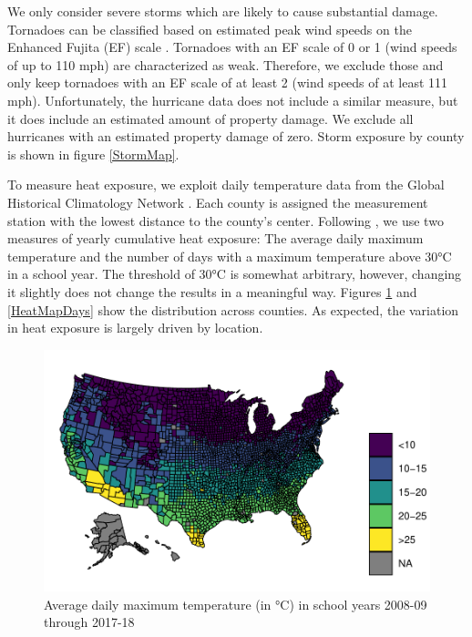 We only consider severe storms which are likely to cause substantial damage. Tornadoes can be classified based on estimated peak wind speeds on the Enhanced Fujita (EF) scale \citep[for more details see][]{EF_Scale}. Tornadoes with an EF scale of 0 or 1 (wind speeds of up to 110 mph) are characterized as weak. Therefore, we exclude those and only keep tornadoes with an EF scale of at least 2 (wind speeds of at least 111 mph). Unfortunately, the hurricane data does not include a similar measure, but it does include an estimated amount of property damage. We exclude all hurricanes with an estimated property damage of zero.  Storm exposure by county is shown in figure \ref{StormMap}.

To measure heat exposure, we exploit daily temperature data from the Global Historical Climatology Network \citep{Menne_2012}. Each county is assigned the measurement station with the lowest distance to the county's center. Following \cite{Goodman_2020}, we use two measures of yearly cumulative heat exposure: The average daily maximum temperature and the number of days with a maximum temperature above 30°C in a school year. The threshold of 30°C is somewhat arbitrary, however, changing it slightly does not change the results in a meaningful way. Figures \ref{HeatMapTemp} and \ref{HeatMapDays} show the distribution across counties. As expected, the variation in heat exposure is largely driven by location.

\begin{figure}[!h]
	\centering
	\includegraphics[scale=1]{"../Code & Data/HeatMapTemp.pdf"}
	\caption{Average daily maximum temperature (in °C) in school years 2008-09 through 2017-18}
	\label{HeatMapTemp}
\end{figure}

